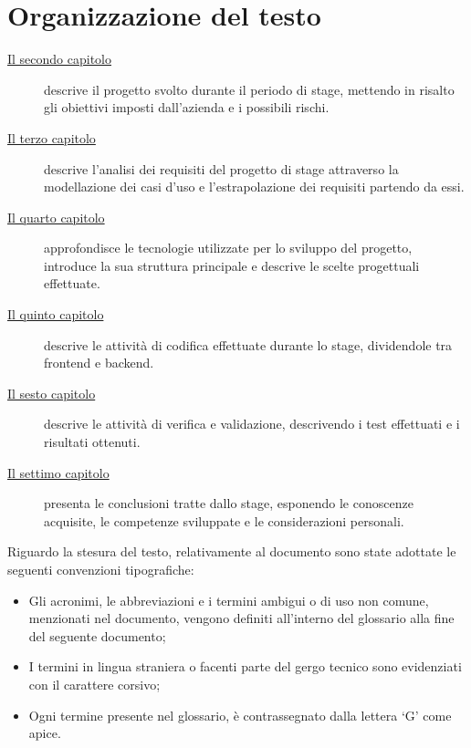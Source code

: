 \section{Organizzazione del testo}
\begin{description}
    \item[{\hyperref[cap:descrizione-stage]{Il secondo capitolo}}] descrive il progetto svolto durante il periodo di stage, mettendo in risalto gli obiettivi imposti dall'azienda e i possibili rischi.
    \item[{\hyperref[cap:analisi-requisiti]{Il terzo capitolo}}] descrive l'analisi dei requisiti del progetto di stage attraverso la modellazione dei casi d'uso e l'estrapolazione dei requisiti partendo da essi.
    \item[{\hyperref[cap:struttura-progettazione]{Il quarto capitolo}}] approfondisce le tecnologie utilizzate per lo sviluppo del progetto, introduce la sua struttura principale e descrive le scelte progettuali effettuate.
    \item[{\hyperref[cap:codifica]{Il quinto capitolo}}] descrive le attività di codifica effettuate durante lo stage, dividendole tra frontend e backend.
    \item[{\hyperref[cap:verifica-validazione]{Il sesto capitolo}}] descrive le attività di verifica e validazione, descrivendo i test effettuati e i risultati ottenuti.
    \item[{\hyperref[cap:conclusioni]{Il settimo capitolo}}] presenta le conclusioni tratte dallo stage, esponendo le conoscenze acquisite, le competenze sviluppate e le considerazioni personali. 
\end{description}

\clearpage

Riguardo la stesura del testo, relativamente al documento sono state adottate le seguenti convenzioni tipografiche:
\begin{itemize}
  \item Gli acronimi, le abbreviazioni e i termini ambigui o di uso non comune, menzionati nel documento, vengono definiti all'interno del glossario alla fine del seguente documento;
  \item I termini in lingua straniera o facenti parte del gergo tecnico sono evidenziati con il carattere corsivo;
  \item Ogni termine presente nel glossario, è contrassegnato dalla lettera `G' come apice.
\end{itemize}
